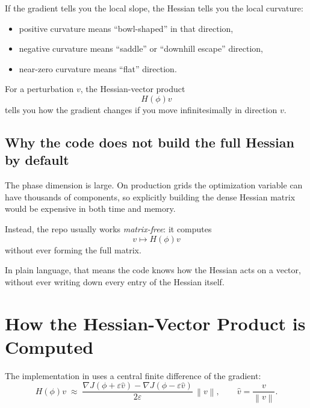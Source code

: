 \documentclass[11pt,letterpaper]{article}
\newcommand{\norm}[1]{\left\lVert #1 \right\rVert}
\begin{document}
If the gradient tells you the local slope, the Hessian tells you the local
curvature:
\begin{itemize}[leftmargin=*]
  \item positive curvature means ``bowl-shaped'' in that direction,
  \item negative curvature means ``saddle'' or ``downhill escape'' direction,
  \item near-zero curvature means ``flat'' direction.
\end{itemize}

For a perturbation $v$, the Hessian-vector product
\[
H(\phi)v
\]
tells you how the gradient changes if you move infinitesimally in direction
$v$.

\subsection{Why the code does not build the full Hessian by default}

The phase dimension is large. On production grids the optimization variable can
have thousands of components, so explicitly building the dense Hessian matrix
would be expensive in both time and memory.

Instead, the repo usually works \emph{matrix-free}: it computes
\[
v \mapsto H(\phi)v
\]
without ever forming the full matrix.

In plain language, that means the code knows how the Hessian acts on a vector,
without ever writing down every entry of the Hessian itself.

\section{How the Hessian-Vector Product is Computed}

The implementation in  uses a
central finite difference of the gradient:
\[
H(\phi)v
\;\approx\;
\frac{\nabla J(\phi + \varepsilon \hat v) - \nabla J(\phi - \varepsilon \hat v)}
     {2\varepsilon}\,\norm{v},
\qquad
\hat v = \frac{v}{\norm{v}}.
\]
\end{document}
